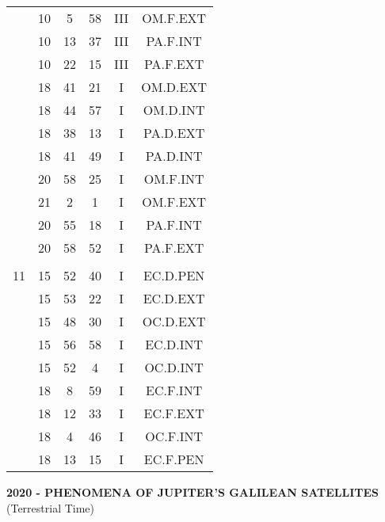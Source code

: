 \documentclass[12pt, a4paper]{article}
\begin{document}
\begin{multicols}{3}
{\begin{tabular}{c c c c c c}
	 	 	 	 & 10 & 5 & 58 & III & OM.F.EXT\\%
	 	 	 	 & 10 & 13 & 37 & III & PA.F.INT\\%
	 	 	 	 & 10 & 22 & 15 & III & PA.F.EXT\\%
	 	 	 	 & 18 & 41 & 21 & I & OM.D.EXT\\%
	 	 	 	 & 18 & 44 & 57 & I & OM.D.INT\\%
	 	 	 	 & 18 & 38 & 13 & I & PA.D.EXT\\%
	 	 	 	 & 18 & 41 & 49 & I & PA.D.INT\\%
	 	 	 	 & 20 & 58 & 25 & I & OM.F.INT\\%
	 	 	 	 & 21 & 2 & 1 & I & OM.F.EXT\\%
	 	 	 	 & 20 & 55 & 18 & I & PA.F.INT\\%
	 	 	 	 & 20 & 58 & 52 & I & PA.F.EXT\\%
	 	 	 	 & & & & & \\%
	 	 	 	11 & 15 & 52 & 40 & I & EC.D.PEN\\%
	 	 	 	 & 15 & 53 & 22 & I & EC.D.EXT\\%
	 	 	 	 & 15 & 48 & 30 & I & OC.D.EXT\\%
	 	 	 	 & 15 & 56 & 58 & I & EC.D.INT\\%
	 	 	 	 & 15 & 52 & 4 & I & OC.D.INT\\%
	 	 	 	 & 18 & 8 & 59 & I & EC.F.INT\\%
	 	 	 	 & 18 & 12 & 33 & I & EC.F.EXT\\%
	 	 	 	 & 18 & 4 & 46 & I & OC.F.INT\\%
	 	 	 	 & 18 & 13 & 15 & I & EC.F.PEN\\%
	 	 \end{tabular}
 	}
\end{multicols}
\pagebreak
\textbf{2020 - PHENOMENA OF JUPITER'S GALILEAN SATELLITES}\\(Terrestrial Time) 
\end{document}
